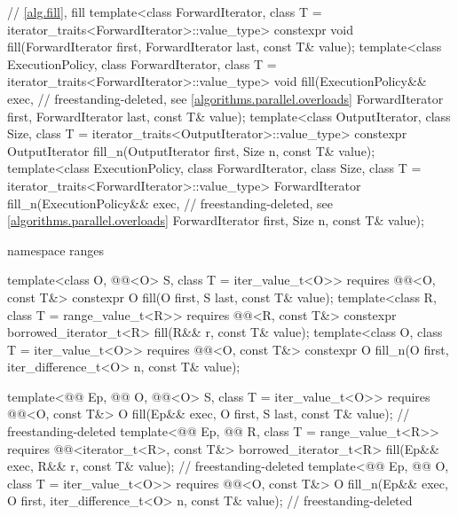 \begin{codeblock}
{  // \ref{alg.fill}, fill
  template<class ForwardIterator, class T = iterator_traits<ForwardIterator>::value_type>
    constexpr void fill(ForwardIterator first, ForwardIterator last, const T& value);
  template<class ExecutionPolicy, class ForwardIterator,
           class T = iterator_traits<ForwardIterator>::value_type>
    void fill(ExecutionPolicy&& exec,                           // freestanding-deleted, see \ref{algorithms.parallel.overloads}
              ForwardIterator first, ForwardIterator last, const T& value);
  template<class OutputIterator, class Size,
           class T = iterator_traits<OutputIterator>::value_type>
    constexpr OutputIterator fill_n(OutputIterator first, Size n, const T& value);
  template<class ExecutionPolicy, class ForwardIterator,
           class Size, class T = iterator_traits<ForwardIterator>::value_type>
    ForwardIterator fill_n(ExecutionPolicy&& exec,              // freestanding-deleted, see \ref{algorithms.parallel.overloads}
                           ForwardIterator first, Size n, const T& value);

  namespace ranges {
    template<class O, @@<O> S, class T = iter_value_t<O>>
      requires @@<O, const T&>
      constexpr O fill(O first, S last, const T& value);
    template<class R, class T = range_value_t<R>>
      requires @@<R, const T&>
      constexpr borrowed_iterator_t<R> fill(R&& r, const T& value);
    template<class O, class T = iter_value_t<O>>
      requires @@<O, const T&>
      constexpr O fill_n(O first, iter_difference_t<O> n, const T& value);

    template<@@ Ep, @@ O, @@<O> S,
             class T = iter_value_t<O>>
      requires @@<O, const T&>
      O fill(Ep&& exec, O first, S last, const T& value);                   // freestanding-deleted
    template<@@ Ep, @@ R, class T = range_value_t<R>>
      requires @@<iterator_t<R>, const T&>
      borrowed_iterator_t<R> fill(Ep&& exec, R&& r, const T& value);        // freestanding-deleted
    template<@@ Ep, @@ O, class T = iter_value_t<O>>
      requires @@<O, const T&>
      O fill_n(Ep&& exec, O first, iter_difference_t<O> n, const T& value); // freestanding-deleted
  }

}
\end{codeblock}
